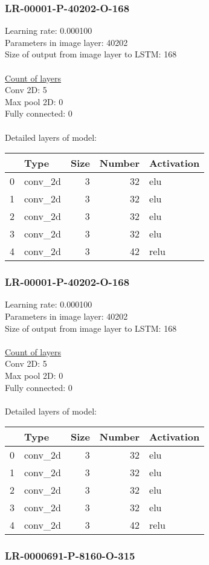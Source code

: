 \subsubsection*{LR-00001-P-40202-O-168}
Learning rate: 0.000100
\\Parameters in image layer: 40202
\\Size of output from image layer to LSTM: 168
\\\\\underline{Count of layers} 
\\Conv 2D:           5\\Max pool 2D:      0\\Fully connected:  0
\\\\Detailed layers of model: \\\begin{tabular}{rlrrl}
\hline
    & Type    &   Size &   Number & Activation   \\
\hline
  0 & conv\_2d &      3 &       32 & elu          \\
  1 & conv\_2d &      3 &       32 & elu          \\
  2 & conv\_2d &      3 &       32 & elu          \\
  3 & conv\_2d &      3 &       32 & elu          \\
  4 & conv\_2d &      3 &       42 & relu         \\
\hline
\end{tabular}\subsubsection*{LR-00001-P-40202-O-168}
Learning rate: 0.000100
\\Parameters in image layer: 40202
\\Size of output from image layer to LSTM: 168
\\\\\underline{Count of layers} 
\\Conv 2D:           5\\Max pool 2D:      0\\Fully connected:  0
\\\\Detailed layers of model: \\\begin{tabular}{rlrrl}
\hline
    & Type    &   Size &   Number & Activation   \\
\hline
  0 & conv\_2d &      3 &       32 & elu          \\
  1 & conv\_2d &      3 &       32 & elu          \\
  2 & conv\_2d &      3 &       32 & elu          \\
  3 & conv\_2d &      3 &       32 & elu          \\
  4 & conv\_2d &      3 &       42 & relu         \\
\hline
\end{tabular}\subsubsection*{LR-0000691-P-8160-O-315}
